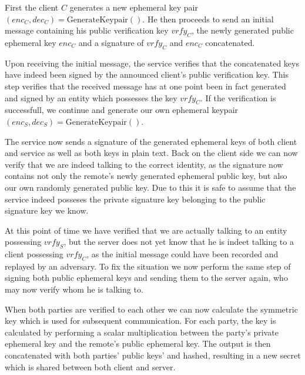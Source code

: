 First the client $C$ generates a new ephemeral key pair $(enc_C, dec_C) = \text{GenerateKeypair}()$.
He then proceeds to send an initial message containing his public verification key $vrfy_C$, the newly generated public ephemeral key $enc_C$ and a signature of $vrfy_C$ and $enc_C$ concatenated.

Upon receiving the initial message, the service verifies that the concatenated keys have indeed been signed by the announced client's public verification key.
This step verifies that the received message has at one point been in fact generated and signed by an entity which possesses the key $vrfy_C$.
If the verification is successfull, we continue and generate our own ephemeral keypair $(enc_S, dec_S) = \text{GenerateKeypair}()$.

The service now sends a signature of the generated ephemeral keys of both client and service as well as both keys in plain text.
Back on the client side we can now verify that we are indeed talking to the correct identity, as the signature now contains not only the remote's newly generated ephemeral public key, but also our own randomly generated public key.
Due to this it is safe to assume that the service indeed posseses the private signature key belonging to the public signature key we know.

At this point of time we have verified that we are actually talking to an entity possessing $vrfy_S$, but the server does not yet know that he is indeet talking to a client possessing $vrfy_C$, as the initial message could have been recorded and replayed by an adversary.
To fix the situation we now perform the same step of signing both public ephemeral keys and sending them to the server again, who may now verify whom he is talking to.

When both parties are verified to each other we can now calculate the symmetric key which is used for subsequent communication.
For each party, the key is calculated by performing a scalar multiplication between the party's private ephemeral key and the remote's public ephemeral key.
The output is then concatenated with both parties' public keys' and hashed, resulting in a new secret which is shared between both client and server.

